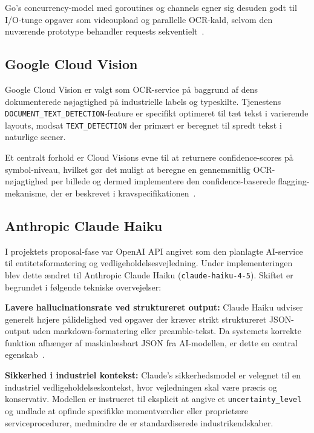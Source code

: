 Go's concurrency-model med goroutines og channels egner sig desuden godt til I/O-tunge opgaver som videoupload og parallelle OCR-kald, selvom den nuværende prototype behandler requests sekventielt~\cite{go_docs}.

\subsection{Google Cloud Vision}
\label{subsec:google-vision}

Google Cloud Vision er valgt som OCR-service på baggrund af dens dokumenterede nøjagtighed på industrielle labels og typeskilte. Tjenestens \texttt{DOCUMENT\_TEXT\_DETECTION}-feature er specifikt optimeret til tæt tekst i varierende layouts, modsat \texttt{TEXT\_DETECTION} der primært er beregnet til spredt tekst i naturlige scener.

Et centralt forhold er Cloud Visions evne til at returnere confidence-scores på symbol-niveau, hvilket gør det muligt at beregne en gennemsnitlig OCR-nøjagtighed per billede og dermed implementere den confidence-baserede flagging-mekanisme, der er beskrevet i kravspecifikationen~\cite{google_vision}.

\subsection{Anthropic Claude Haiku}
\label{subsec:claude}

I projektets proposal-fase var OpenAI API angivet som den planlagte AI-service til entitetsformatering og vedligeholdelsesvejledning. Under implementeringen blev dette ændret til Anthropic Claude Haiku (\texttt{claude-haiku-4-5}). Skiftet er begrundet i følgende tekniske overvejelser:

\textbf{Lavere hallucinationsrate ved struktureret output:} Claude Haiku udviser generelt højere pålidelighed ved opgaver der kræver strikt struktureret JSON-output uden markdown-formatering eller preamble-tekst. Da systemets korrekte funktion afhænger af maskinlæsbart JSON fra AI-modellen, er dette en central egenskab~\cite{anthropic_claude}.

\textbf{Sikkerhed i industriel kontekst:} Claude's sikkerhedsmodel er velegnet til en industriel vedligeholdelseskontekst, hvor vejledningen skal være præcis og konservativ. Modellen er instrueret til eksplicit at angive et \texttt{uncertainty\_level} og undlade at opfinde specifikke momentværdier eller proprietære serviceprocedurer, medmindre de er standardiserede industrikendskaber.

